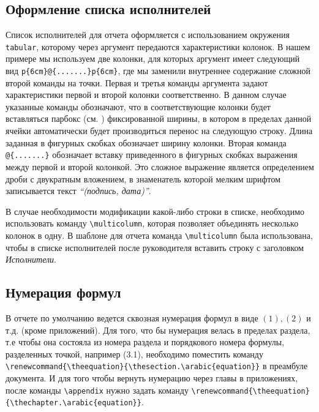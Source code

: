 \subsection{Оформление списка исполнителей}

Список исполнителей для отчета оформляется с использованием окружения \verb|tabular|, которому через аргумент передаются характеристики колонок. В нашем примере мы используем две колонки, для которых аргумент имеет следующий вид \verb|p{6cm}@{.......}p{6cm}|, где мы заменили внутреннее содержание сложной второй команды на точки. Первая и третья команды аргумента задают характеристики первой и второй колонки соответственно. В данном случае указанные команды обозначают, что в соответствующие колонки будет вставляться парбокс (см. \cite[глава 9]{Kotelnikov}) фиксированной ширины, в котором в пределах данной ячейки автоматически будет производиться перенос на следующую строку. Длина заданная в фигурных скобках обозначает ширину колонки. Вторая команда \verb|@{.......}| обозначает вставку приведенного в фигурных скобках выражения между первой и второй колонкой. Это сложное выражение является определением дроби с двукратным вложением, в знаменатель которой мелким шрифтом записывается текст {\itshape ``(подпись,
дата)''}.

В случае необходимости модификации какой-либо строки в списке, необходимо использовать команду \verb|\multicolumn|, которая позволяет объединять несколько колонок в одну. В шаблоне для отчета команда \verb|\multicolumn| была использована, чтобы в списке исполнителей после руководителя вставить строку с заголовком {\itshape Исполнители}.

\subsection{Нумерация формул}

В отчете по умолчанию ведется сквозная нумерация формул  в виде $(1), (2)$ и т.д. (кроме приложений). Для того, что бы нумерация велась в пределах раздела, т.е чтобы она состояла  из номера раздела и порядкового номера формулы, разделенных точкой, например (3.1), необходимо поместить команду \verb|\renewcommand{\theequation}{\thesection.\arabic{equation}}| в преамбуле документа. И для того чтобы вернуть нумерацию через главы в приложениях, после команды \verb|\appendix| нужно задать команду \verb|\renewcommand{\theequation}{\thechapter.\arabic{equation}}|.

